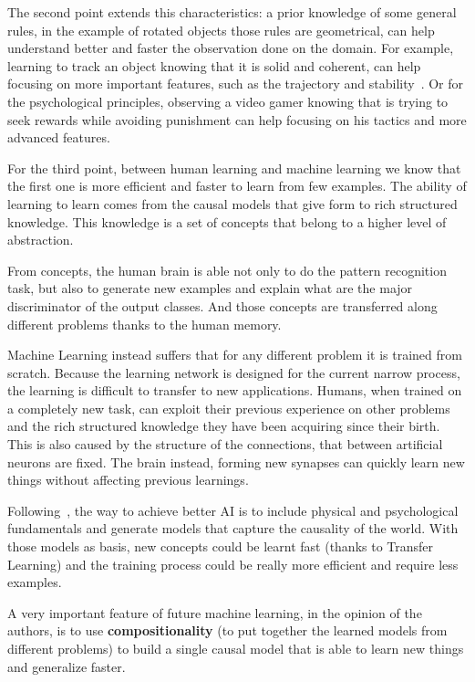 The second point extends this characteristics: a prior knowledge of some general rules, in the example of rotated objects those rules are geometrical, can help understand better and faster the observation done on the domain. For example, learning to track an object knowing that it is solid and coherent, can help focusing on more important features, such as the trajectory and stability~\cite{lerer2016learning}. Or for the psychological principles, observing a video gamer knowing that is trying to seek rewards while avoiding punishment can help focusing on his tactics and more advanced features.

For the third point, between human learning and machine learning we know that the first one is more efficient and faster to learn from few examples. The ability of learning to learn comes from the causal models that give form to rich structured knowledge. This knowledge is a set of concepts that belong to a higher level of abstraction.

From concepts, the human brain is able not only to do the pattern recognition task, but also to generate new examples and explain what are the major discriminator of the output classes. And those concepts are transferred along different problems thanks to the human memory.

Machine Learning instead suffers that for any different problem it is trained from scratch. Because the learning network is designed for the current narrow process, the learning is difficult to transfer to new applications. Humans, when trained on a completely new task, can exploit their previous experience on other problems and the rich structured knowledge they have been acquiring since their birth. This is also caused by the structure of the connections, that between artificial neurons are fixed. The brain instead, forming new synapses can quickly learn new things without affecting previous learnings.~\cite{hawkins2016neurons}

Following~\cite{pearl2018theoretical}, the way to achieve better AI is to include physical and psychological fundamentals and generate models that capture the causality of the world. With those models as basis, new concepts could be learnt fast (thanks to Transfer Learning) and the training process could be really more efficient and require less examples.

A very important feature of future machine learning, in the opinion of the authors, is to use \textbf{compositionality} (to put together the learned models from different problems) to build a single causal model that is able to learn new things and generalize faster.

